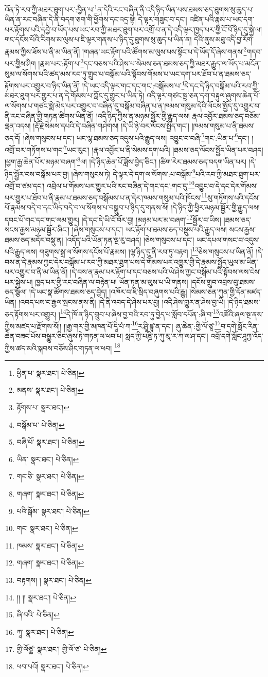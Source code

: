 འོན་ཏེ་རབ་ཀྱི་མཐར་ཐུག་པར་:བྱིན་པ་\footnote{ཕྱིན་པ་  སྣར་ཐང་།  པེ་ཅིན། }ན་དེའི་རང་བཞིན་ནི་འདི་ཉིད་ཡིན་པས་ཐམས་ཅད་ཐུགས་སུ་ཆུད་པ་ཡིན་ན་རང་བཞིན་དེ་ནི་བདག་ཅག་གི་ཕྱོགས་དང་འདྲ་སྟེ། དེ་ལྟར་གཟུང་བ་དང་། འཛིན་པའི་རྣམ་པ་ཡང་དག་པར་རྟོགས་པའི་དབྱེ་བ་ཡོད་པས་ཡང་རབ་ཀྱི་མཐར་ཐུག་པར་འགྲོ་བ་ན་དེ་འདི་ལྟར་ཁྱད་པར་གྱི་ངོ་བོ་ཉིད་དུ་སྐྱེ་ལ། གང་དངོས་པོའི་རིགས་མ་ལུས་པ་ཇི་ལྟར་གནས་པ་ཉིད་དུ་ཐུགས་སུ་ཆུད་པ་ཡིན་ན། དེའི་ནུས་མཐུ་འདི་བྱ་རོག་རྣམས་ཀྱིས་ཟོས་པ་ནི་མ་ཡིན་ནོ། །གཞན་ཡང་རྟོག་པའི་ཚོགས་མ་ལུས་པས་སྟོང་པ་དེ་ཡོད་དོ་ཞེས་གནས་\footnote{མནས་  སྣར་ཐང་།  པེ་ཅིན། }གདབ་པར་གྱིས་ཤིག །རྣམ་པར་:རྟོག་པ་\footnote{རྟོགས་པ་  སྣར་ཐང་། }དང་བཅས་པའི་ཤེས་པ་སེམས་ཅན་ཐམས་ཅད་ཀྱི་མཐར་རྒྱུད་ལ་ཡོད་པ་མངོན་སུམ་ལ་སོགས་པའི་ཚད་མས་རབ་ཏུ་གྲུབ་པ་བསྒོམ་པའི་སྟོབས་གོམས་པ་ཡང་དག་པར་ཐོབ་པ་ན་ཐམས་ཅད་རྟོགས་པར་འགྱུར་བ་ཉིད་ཡིན་ནོ། །དེ་ཡང་འདི་ལྟར་གང་དང་གང་:བསྒོམས་པ་\footnote{བསྒོམ་པ་  པེ་ཅིན། }དེ་དང་དེ་ཉིད་བསྒོམ་པའི་རབ་ཀྱི་མཐར་ཐུག་པར་གྱུར་པ་ན་དེ་གོམས་པ་ཀློང་དུ་གྱུར་པ་ཡིན་ཏེ། འདི་ལྟར་གཙང་སྦྲ་ཅན་དག་བརྟུལ་ཞུགས་ཆེན་པོ་ལ་སོགས་པ་གཙང་སྨེ་མེད་པར་འགྱུར་བ་བཞིན་དུ་བསྒོམ་བཞིན་པ་ན་ཁམས་གསུམ་དེའི་ལོངས་སྤྱོད་དུ་འགྱུར་བ་ནི་རང་བཞིན་གྱི་གཏན་ཚིགས་ཡིན་ནོ། །འདི་ཉིད་ཀྱིས་ན་མཉམ་སྦྱོར་གྱི་རྒྱུད་ལས། རྣལ་འབྱོར་ཐམས་ཅད་བཅོམ་ལྡན་འདས། །རྡོ་རྗེ་སེམས་དཔའི་དེ་བཞིན་གཤེགས། །དེ་ཡི་ཉེ་བར་ལོངས་སྤྱོད་གང་། །ཁམས་གསུམ་པ་ནི་ཐམས་ཅད་དོ། །ཞེས་གསུངས་པ་དང་། ཡང་ལྷ་ཐམས་ཅད་འདུས་པའི་རྒྱུད་ལས། འབྱུང་བ་བཞི་\footnote{བཞི་པོ་  སྣར་ཐང་།  པེ་ཅིན། }གང་:ཡིན་པ་\footnote{ཡིན་  སྣར་ཐང་།  པེ་ཅིན། }དང་། །འགྲོ་བར་གཏོགས་པ་གང་\footnote{གང་ཅི་  སྣར་ཐང་།  པེ་ཅིན། }ཡང་རུང་། །རྣལ་འབྱོར་པ་ནི་སེམས་དག་པའི། །ཐམས་ཅད་ལོངས་སྤྱོད་ཡིན་པར་བཤད། །ཕྱག་རྒྱ་ཆེན་པོར་མཉམ་བཞག་\footnote{གཞག་  སྣར་ཐང་།  པེ་ཅིན། }ལ། །དེ་ཉིད་ཆེན་པོ་ཟློས་བྱེད་ཅིང་། །ཚིག་རེར་ཐམས་ཅད་བདག་ཡིན་པར། །དེ་ཉིད་སྦྱོར་བས་བསྒོམ་པར་བྱ། །ཞེས་གསུངས་ཏེ། དེ་ལྟར་དེ་དག་ལ་སོགས་:པ་བསྒོམ་\footnote{པའི་སྒོམ་  སྣར་ཐང་།  པེ་ཅིན། }པའི་རབ་ཀྱི་མཐར་ཐུག་པར་འགྲོ་བ་ཙམ་དང་། འབྲེལ་པ་གོམས་པར་གྱུར་པའི་རང་བཞིན་དེ་གང་དང་:གང་དུ་\footnote{གང་  སྣར་ཐང་།  པེ་ཅིན། }འབྱུང་བ་དེ་དང་དེར་གོམས་པར་གྱུར་པ་ཐོབ་པ་ནི་རྣམ་པ་ཐམས་ཅད་བསྒོམས་པ་ན་དེར་ཁམས་གསུམ་པའི་ཁོངས་\footnote{ཁམས་  སྣར་ཐང་།  པེ་ཅིན། }སུ་གཏོགས་པའི་དངོས་པོ་རྣམས་བདེ་བ་དང་ཡིད་བདེ་བ་ལ་སོགས་པ་བསྒྲུབ་པ་ཉིད་དུ་གནས་སོ། །དེ་ཉིད་ཀྱི་ཕྱིར་མཉམ་སྦྱོར་གྱི་རྒྱུད་ལས། དབང་པོ་གང་དང་གང་ལམ་གྱུར། །དེ་དང་དེ་ཡི་ངོ་བོར་བྱ། །མཉམ་པར་མ་བཞག་\footnote{གཞག་  སྣར་ཐང་།  པེ་ཅིན། }སྦྱོར་བ་ཡིས། །ཐམས་ཅད་སངས་རྒྱས་མཉམ་སྦྱོར་ཞིང་། །ཞེས་གསུངས་པ་དང་། ཡང་རྟོག་པ་ཐམས་ཅད་བསྡུས་པའི་རྒྱུད་ལས། སངས་རྒྱས་ཐམས་ཅད་མདོར་བསྡུ་ན། །འདོད་པའི་ཡོན་ཏན་ལྔ་རུ་བཤད། །ཅེས་གསུངས་པ་དང་། ཡང་དཔལ་གསང་བ་འདུས་པའི་རྒྱུད་ལས། གཟུགས་སྒྲ་ལ་སོགས་དངོས་པོ་རྣམས། །ལྷ་ཉིད་དུ་ནི་རབ་ཏུ་བརྟག །\footnote{བརྟགས། །  སྣར་ཐང་།  པེ་ཅིན། }ཅེས་གསུངས་པ་ཡིན་ནོ། །དེ་བས་ན་དེ་རྣམས་ཀྱང་དེར་བསྒོམ་པ་རབ་ཀྱི་མཐར་ཐུག་པས་དེ་གོམས་པར་འགྱུར་གྱི་དེ་རྣམས་སྤྱོད་ཡུལ་མ་ཡིན་པར་འགྱུར་བ་ནི་མ་ཡིན་ནོ། །དེ་བས་ན་རྣམ་པར་རྟོག་པ་དང་བཅས་པའི་ཡེ་ཤེས་ཀྱང་བསྒོམ་པའི་སྟོབས་ལས་ངེས་པར་སྐྱེས་པ། ཁྱད་པར་གྱི་རང་བཞིན་ལ་བརྟེན་པ། ཡོན་ཏན་མ་ལུས་པ་ཡི་གནས། །དངོས་གྲུབ་འབྲས་བུ་ཐམས་ཅད་སྩོལ། །དེ་ཡང་སྣ་ཚོགས་ཐམས་ཅད་བྱེད། །འཁོར་བ་ཇི་སྲིད་བཞུགས་པའི་རྒྱུ། །སེམས་ཅན་ཀུན་གྱི་དོན་མཛད་ཡིན། །འབད་པས་ང་རྒྱལ་སྤངས་ནས་ནི། །དེ་ནི་འབད་དེ་ཤེས་པར་བྱ། །འདི་ཤེས་གྱུར་ན་ཤེས་བྱ་ཡི། །དེ་ཉིད་ཐམས་ཅད་རྟོགས་པར་འགྱུར། །\footnote{།། །།  སྣར་ཐང་།  པེ་ཅིན། }དེ་ཁོ་ན་ཉིད་གྲུབ་པ་ཞེས་བྱ་བའི་རབ་ཏུ་བྱེད་པ་སློབ་དཔོན་:ཞི་བ་\footnote{ཞི་བའི་  པེ་ཅིན། }འཚོའི་ཞལ་སྔ་ནས་ཀྱིས་མཛད་པ་རྫོགས་སོ།། །།རྒྱ་གར་གྱི་མཁན་པོ་དཱི་པཾ་ཀ་\footnote{ཀཱ་  སྣར་ཐང་།  པེ་ཅིན། }ར་ཤྲཱི་ཛྙཱ་ན་དང་། ཞུ་ཆེན་:གྱི་ལོ་ཙཱ་\footnote{གྱི་ལོཙྪ་  སྣར་ཐང་། གྱི་ལོ་ཙ་  པེ་ཅིན། }བ་དགེ་སློང་རིན་ཆེན་བཟང་པོས་བསྒྱུར་ཅིང་ཞུས་ཏེ་གཏན་ལ་ཕབ་པ། སླད་ཀྱི་པཎྜི་ཏ་ཀུ་མཱ་ར་ཀ་ལ་ཤ་དང་། འབྲོ་དགེ་སློང་ཤཱཀྱ་འོད་ཀྱིས་ཚད་མའི་སྐབས་བཅོས་ཤིང་གཏན་ལ་ཕབ། \footnote{ཕབ་པའོ།   སྣར་ཐང་།  པེ་ཅིན། }